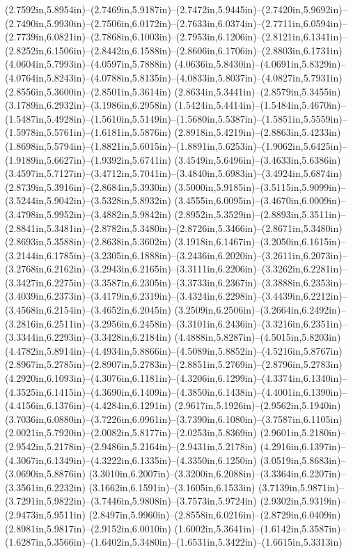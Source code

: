 (2.7592in,5.8954in)--(2.7469in,5.9187in)--(2.7472in,5.9445in)--(2.7420in,5.9692in)--(2.7490in,5.9930in)--(2.7506in,6.0172in)--(2.7633in,6.0374in)--(2.7711in,6.0594in)--(2.7739in,6.0821in)--(2.7868in,6.1003in)--(2.7953in,6.1206in)--(2.8121in,6.1341in)--(2.8252in,6.1506in)--(2.8442in,6.1588in)--(2.8606in,6.1706in)--(2.8803in,6.1731in) (4.0604in,5.7993in)--(4.0597in,5.7888in) (4.0636in,5.8430in)--(4.0691in,5.8329in)--(4.0764in,5.8243in)--(4.0788in,5.8135in)--(4.0833in,5.8037in)--(4.0827in,5.7931in) (2.8556in,5.3600in)--(2.8501in,5.3614in) (2.8634in,5.3441in)--(2.8579in,5.3455in) (3.1789in,6.2932in)--(3.1986in,6.2958in) (1.5424in,5.4414in)--(1.5484in,5.4670in)--(1.5487in,5.4928in)--(1.5610in,5.5149in)--(1.5680in,5.5387in)--(1.5851in,5.5559in)--(1.5978in,5.5761in)--(1.6181in,5.5876in) (2.8918in,5.4219in)--(2.8863in,5.4233in) (1.8698in,5.5794in)--(1.8821in,5.6015in)--(1.8891in,5.6253in)--(1.9062in,5.6425in)--(1.9189in,5.6627in)--(1.9392in,5.6741in) (3.4549in,5.6496in)--(3.4633in,5.6386in) (3.4597in,5.7127in)--(3.4712in,5.7041in)--(3.4840in,5.6983in)--(3.4924in,5.6874in) (2.8739in,5.3916in)--(2.8684in,5.3930in) (3.5000in,5.9185in)--(3.5115in,5.9099in)--(3.5244in,5.9042in)--(3.5328in,5.8932in) (3.4555in,6.0095in)--(3.4670in,6.0009in)--(3.4798in,5.9952in)--(3.4882in,5.9842in) (2.8952in,5.3529in)--(2.8893in,5.3511in)--(2.8841in,5.3481in)--(2.8782in,5.3480in)--(2.8726in,5.3466in)--(2.8671in,5.3480in) (2.8693in,5.3588in)--(2.8638in,5.3602in) (3.1918in,6.1467in)--(3.2050in,6.1615in)--(3.2144in,6.1785in)--(3.2305in,6.1888in)--(3.2436in,6.2020in)--(3.2611in,6.2073in)--(3.2768in,6.2162in)--(3.2943in,6.2165in)--(3.3111in,6.2206in)--(3.3262in,6.2281in)--(3.3427in,6.2275in)--(3.3587in,6.2305in)--(3.3733in,6.2367in)--(3.3888in,6.2353in)--(3.4039in,6.2373in)--(3.4179in,6.2319in)--(3.4324in,6.2298in)--(3.4439in,6.2212in)--(3.4568in,6.2154in)--(3.4652in,6.2045in) (3.2509in,6.2506in)--(3.2664in,6.2492in)--(3.2816in,6.2511in)--(3.2956in,6.2458in)--(3.3101in,6.2436in)--(3.3216in,6.2351in)--(3.3344in,6.2293in)--(3.3428in,6.2184in) (4.4888in,5.8287in)--(4.5015in,5.8203in) (4.4782in,5.8914in)--(4.4934in,5.8866in)--(4.5089in,5.8852in)--(4.5216in,5.8767in) (2.8967in,5.2785in)--(2.8907in,5.2783in)--(2.8851in,5.2769in)--(2.8796in,5.2783in) (4.2920in,6.1093in)--(4.3076in,6.1181in)--(4.3206in,6.1299in)--(4.3374in,6.1340in)--(4.3525in,6.1415in)--(4.3690in,6.1409in)--(4.3850in,6.1438in)--(4.4001in,6.1390in)--(4.4156in,6.1376in)--(4.4284in,6.1291in) (2.9617in,5.1926in)--(2.9562in,5.1940in) (3.7036in,6.0880in)--(3.7226in,6.0961in)--(3.7390in,6.1080in)--(3.7587in,6.1105in) (2.0021in,5.7920in)--(2.0082in,5.8177in)--(2.0253in,5.8369in) (2.9601in,5.2180in)--(2.9542in,5.2178in)--(2.9486in,5.2164in)--(2.9431in,5.2178in) (4.2916in,6.1397in)--(4.3067in,6.1349in)--(4.3222in,6.1335in)--(4.3350in,6.1250in) (3.0519in,5.8683in)--(3.0690in,5.8876in) (3.3010in,6.2007in)--(3.3200in,6.2088in)--(3.3364in,6.2207in)--(3.3561in,6.2232in) (3.1662in,6.1591in)--(3.1605in,6.1533in) (3.7139in,5.9871in)--(3.7291in,5.9822in)--(3.7446in,5.9808in)--(3.7573in,5.9724in) (2.9302in,5.9319in)--(2.9473in,5.9511in) (2.8497in,5.9960in)--(2.8558in,6.0216in)--(2.8729in,6.0409in) (2.8981in,5.9817in)--(2.9152in,6.0010in) (1.6002in,5.3641in)--(1.6142in,5.3587in)--(1.6287in,5.3566in)--(1.6402in,5.3480in)--(1.6531in,5.3422in)--(1.6615in,5.3313in) 